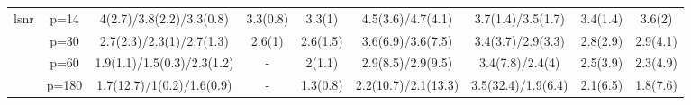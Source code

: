\begin{table}[ht]
{\begin{tabular}{|c|c|ccccccc|}
  \midrule\multirow{4}[2]{*}{lsnr} & p=14 & 4(2.7)/3.8(2.2)/3.3(0.8) & 3.3(0.8) & 3.3(1) & 4.5(3.6)/4.7(4.1) & 3.7(1.4)/3.5(1.7) & 3.4(1.4) & 3.6(2) \\ 
   & p=30 & 2.7(2.3)/2.3(1)/2.7(1.3) & 2.6(1) & 2.6(1.5) & 3.6(6.9)/3.6(7.5) & 3.4(3.7)/2.9(3.3) & 2.8(2.9) & 2.9(4.1) \\ 
   & p=60 & 1.9(1.1)/1.5(0.3)/2.3(1.2) & - & 2(1.1) & 2.9(8.5)/2.9(9.5) & 3.4(7.8)/2.4(4) & 2.5(3.9) & 2.3(4.9) \\ 
   & p=180 & 1.7(12.7)/1(0.2)/1.6(0.9) & - & 1.3(0.8) & 2.2(10.7)/2.1(13.3) & 3.5(32.4)/1.9(6.4) & 2.1(6.5) & 1.8(7.6) \\ 
   \bottomrule 
\end{tabular}
}
\end{table}
